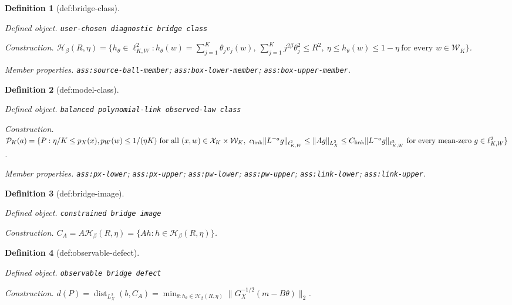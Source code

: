 \documentclass{article}
\newtheorem{definition}{Definition}
\begin{document}
\begin{definition}[def:bridge-class]\label{def:bridge-class}
\par\smallskip\noindent\emph{Defined object.} \texttt{user-\allowbreak{}chosen diagnostic bridge class}
\par\smallskip\noindent\emph{Construction.} \(\mathcal H_\beta(R,\eta)=\{h_\theta\in\ell^2_{K,W}:h_\theta(w)=\sum_{j=1}^K\theta_jv_j(w),\ \sum_{j=1}^Kj^{2\beta}\theta_j^2\le R^2,\ \eta\le h_\theta(w)\le1-\eta\ \text{for every }w\in\mathcal W_K\}\).
\par\smallskip\noindent\emph{Member properties.} \texttt{ass:\allowbreak{}source-\allowbreak{}ball-\allowbreak{}member}; \texttt{ass:\allowbreak{}box-\allowbreak{}lower-\allowbreak{}member}; \texttt{ass:\allowbreak{}box-\allowbreak{}upper-\allowbreak{}member}.
\end{definition}

\begin{definition}[def:model-class]\label{def:model-class}
\par\smallskip\noindent\emph{Defined object.} \texttt{balanced polynomial-\allowbreak{}link observed-\allowbreak{}law class}
\par\smallskip\noindent\emph{Construction.} \(\mathcal P_K(a)=\{P:\eta/K\le p_X(x),p_W(w)\le1/(\eta K)\ \text{for all }(x,w)\in\mathcal X_K\times\mathcal W_K,\ c_{\rm link}\|L^{-a}g\|_{\ell^2_{K,W}}\le\|Ag\|_{L^2_X}\le C_{\rm link}\|L^{-a}g\|_{\ell^2_{K,W}}\ \text{for every mean-zero }g\in\ell^2_{K,W}\}\).
\par\smallskip\noindent\emph{Member properties.} \texttt{ass:\allowbreak{}px-\allowbreak{}lower}; \texttt{ass:\allowbreak{}px-\allowbreak{}upper}; \texttt{ass:\allowbreak{}pw-\allowbreak{}lower}; \texttt{ass:\allowbreak{}pw-\allowbreak{}upper}; \texttt{ass:\allowbreak{}link-\allowbreak{}lower}; \texttt{ass:\allowbreak{}link-\allowbreak{}upper}.
\end{definition}

\begin{definition}[def:bridge-image]\label{def:bridge-image}
\par\smallskip\noindent\emph{Defined object.} \texttt{constrained bridge image}
\par\smallskip\noindent\emph{Construction.} \(C_A=A\mathcal H_\beta(R,\eta)=\{Ah:h\in\mathcal H_\beta(R,\eta)\}\).
\end{definition}

\begin{definition}[def:observable-defect]\label{def:observable-defect}
\par\smallskip\noindent\emph{Defined object.} \texttt{observable bridge defect}
\par\smallskip\noindent\emph{Construction.} \(d(P)=\operatorname{dist}_{L^2_X}(b,C_A)=\min_{\theta:h_\theta\in\mathcal H_\beta(R,\eta)}\|G_X^{-1/2}(m-B\theta)\|_2\).
\end{definition}
\end{document}
